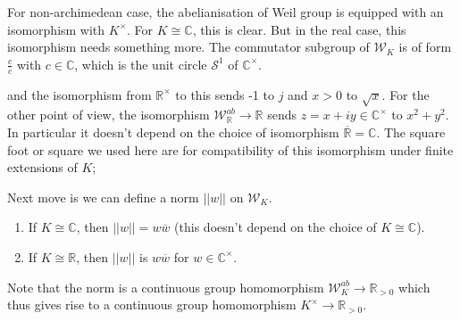 \documentclass[12pt,a4paper,english]{article}
\theoremstyle{definition}
\theoremstyle{plain}
\begin{document}
For non-archimedean case, the abelianisation of Weil group is equipped with an isomorphism with $K^{\times}$. For $K\cong \mathbb{C}$, this is clear. But in the real case, this isomorphism needs something more. The commutator subgroup of $\mathcal{W}_{K}$ is of form $\frac{c}{\overline{c}}$ with $c\in\mathbb{C}$, which is the unit circle $\mathcal{S}^{1}$ of $\mathbb{C}^{\times}$.


and the isomorphism from $\mathbb{R}^{\times}$ to this sends -1 to $j$ and $x>0$ to $\sqrt{x}$. For the other point of view, the isomorphism $\mathcal{W}^{ab}_{\mathbb{R}}\rightarrow \mathbb{R}$ sends $z=x+iy\in \mathbb{C}^{\times}$ to $x^{2}+y^{2}$. In particular it doesn't depend on the choice of isomorphism $\overline{\mathbb{R}}=\mathbb{C}$. The square foot or square we used here are for compatibility of this isomorphism under finite extensions of $K$; 

Next move is we can define a norm $||w||$ on $\mathcal{W}_{K}$. 
\begin{enumerate}
    \item If $K\cong \mathbb{C}$, then $||w||=w\overline{w}$ (this doesn't depend on the choice of $K\cong\mathbb{C}$).
    \item If $K\cong \mathbb{R}$, then $||w||$ is $w\overline{w}$ for $w\in\mathbb{C}^{\times}$. 
\end{enumerate}
Note that the norm is a continuous group homomorphism $\mathcal{W}^{ab}_{K}\rightarrow\mathbb{R}_{>0}$ which thus gives rise to a continuous group homomorphism $K^{\times}\rightarrow \mathbb{R}_{>0}$.
\end{document}
